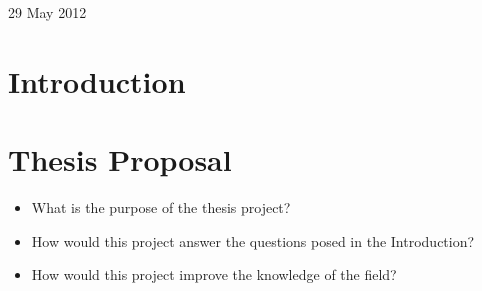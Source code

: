 \documentclass[useAMS,usenatbib,onecolumn]{mn2e}
\begin{document}
\begin{center}
29 May 2012
\end{center}
\newpage

\date{Date of the review}

\section{Introduction}
\label{sec:introduction}



\section{Thesis Proposal}
\label{sec:thesis}

\begin{itemize}
	\item{What is the purpose of the thesis project?}
	\item{How would this project answer the questions posed in the Introduction?}
	\item{How would this project improve the knowledge of the field?}
\end{itemize}

\end{document}
